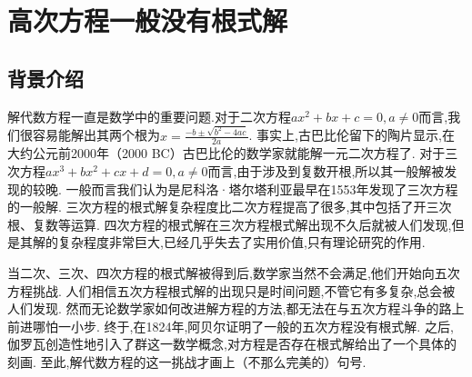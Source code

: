 \documentclass[main]{subfiles}
\begin{document}
\renewcommand{\filename}{No.9Theorem}%
\section{高次方程一般没有根式解}
\subsection{背景介绍}
解代数方程一直是数学中的重要问题.对于二次方程\(ax^2+bx+c=0,a \neq 0\)而言,我们很容易能解出其两个根为\(x= \frac{-b \pm \sqrt{b^2-4ac}}{2a}\).
事实上,古巴比伦留下的陶片显示,在大约公元前2000年（2000 BC）古巴比伦的数学家就能解一元二次方程了.
对于三次方程\(ax^3+bx^2+cx+d=0,a \neq 0\)而言,由于涉及到复数开根,所以其一般解被发现的较晚.
一般而言我们认为是尼科洛·塔尔塔利亚最早在1553年发现了三次方程的一般解.
三次方程的根式解复杂程度比二次方程提高了很多,其中包括了开三次根、复数等运算.
四次方程的根式解在三次方程根式解出现不久后就被人们发现,但是其解的复杂程度非常巨大,已经几乎失去了实用价值,只有理论研究的作用.

当二次、三次、四次方程的根式解被得到后,数学家当然不会满足,他们开始向五次方程挑战.
人们相信五次方程根式解的出现只是时间问题,不管它有多复杂,总会被人们发现.
然而无论数学家如何改进解方程的方法,都无法在与五次方程斗争的路上前进哪怕一小步.
终于,在1824年,阿贝尔证明了一般的五次方程没有根式解.
之后,伽罗瓦创造性地引入了群这一数学概念,对方程是否存在根式解给出了一个具体的刻画.
至此,解代数方程的这一挑战才画上（不那么完美的）句号.
\end{document}
